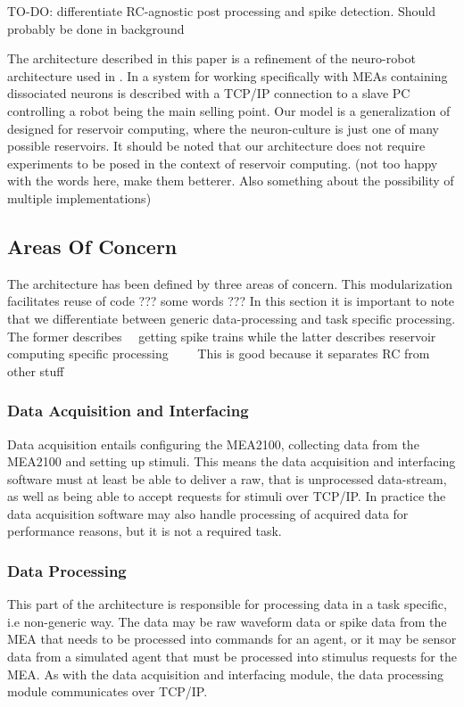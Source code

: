 TO-DO: differentiate RC-agnostic post processing and spike detection.
Should probably be done in background

The architecture described in this paper is a refinement of the neuro-robot
architecture used in \cite{li_application_2015}.
In \cite{li_application_2015} a system for working specifically with MEAs
containing dissociated neurons is described with a TCP/IP connection to a slave
PC controlling a robot being the main selling point. Our model is a
generalization of \cite{li_application_2015} designed for reservoir computing,
where the neuron-culture is just one of many possible reservoirs.
It should be noted that our architecture does not require experiments to be
posed in the context of reservoir computing. (not too happy with the words here,
make them betterer. Also something about the possibility of multiple implementations)
\subsection{Areas Of Concern}
The architecture has been defined by three areas of concern. This modularization
facilitates reuse of code ??? some words ???
In this section it is important to note that we differentiate between generic
data-processing and task specific processing. The former describes ~~getting
spike trains while the latter describes reservoir computing specific processing~~
~~This is good because it separates RC from other stuff~~
\subsubsection{Data Acquisition and Interfacing}
Data acquisition entails configuring the MEA2100, collecting 
data from the MEA2100 and setting up stimuli. This means the data acquisition
and interfacing software must at least be able to deliver a raw, that is
unprocessed data-stream, as well as being able to accept requests for stimuli
over TCP/IP.
In practice the data acquisition software may also handle processing of acquired
data for performance reasons, but it is not a required task.
\subsubsection{Data Processing}
This part of the architecture is responsible for processing data in a task
specific, i.e non-generic way. The data may be raw waveform data or spike data
from the MEA that needs to be processed into commands for an agent, or it may be
sensor data from a simulated agent that must be processed into stimulus requests
for the MEA. As with the data acquisition and interfacing module, the data
processing module communicates over TCP/IP.

